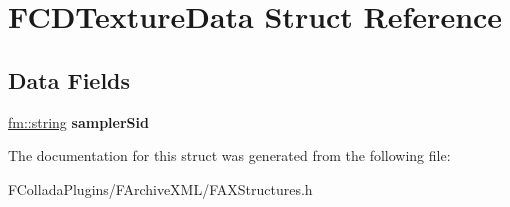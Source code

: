 \hypertarget{structFCDTextureData}{
\section{FCDTextureData Struct Reference}
\label{structFCDTextureData}
}
\subsection*{Data Fields}
\begin{DoxyCompactItemize}
\item 
\hypertarget{structFCDTextureData_a812c4acaaa58ff35b4d7523c5f32d244}{
\hyperlink{classfm_1_1stringT}{fm::string} {\bfseries samplerSid}}
\label{structFCDTextureData_a812c4acaaa58ff35b4d7523c5f32d244}

\end{DoxyCompactItemize}


The documentation for this struct was generated from the following file:\begin{DoxyCompactItemize}
\item 
FColladaPlugins/FArchiveXML/FAXStructures.h\end{DoxyCompactItemize}
